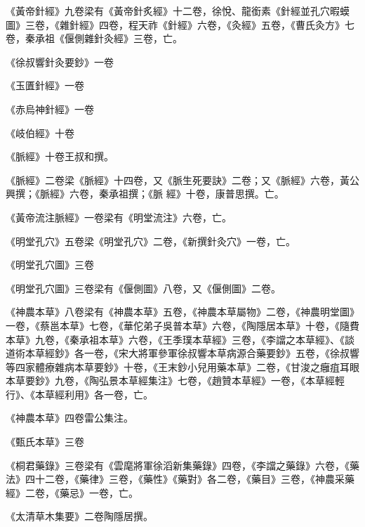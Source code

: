 \begin{pinyinscope}
 《黃帝針經》九卷梁有《黃帝針炙經》十二卷，徐悅、龍銜素《針經並孔穴暇蟆圖》三卷，《雜針經》四卷，程天祚《針經》六卷，《灸經》五卷，《曹氏灸方》七卷，秦承祖《偃側雜針灸經》三卷，亡。



 《徐叔響針灸要鈔》一卷



 《玉匱針經》一卷



 《赤烏神針經》一卷



 《岐伯經》十卷



 《脈經》十卷王叔和撰。



 《脈經》二卷梁《脈經》十四卷，又《脈生死要訣》二卷；又《脈經》六卷，黃公興撰；《脈經》六卷，秦承祖撰；《脈
 經》十卷，康普思撰。亡。



 《黃帝流注脈經》一卷梁有《明堂流注》六卷，亡。



 《明堂孔穴》五卷梁《明堂孔穴》二卷，《新撰針灸穴》一卷，亡。



 《明堂孔穴圖》三卷



 《明堂孔穴圖》三卷梁有《偃側圖》八卷，又《偃側圖》二卷。



 《神農本草》八卷梁有《神農本草》五卷，《神農本草屬物》二卷，《神農明堂圖》一卷，《蔡邕本草》七卷，《華佗弟子吳普本草》六卷，《陶隱居本草》十卷，《隨費本草》九卷，《秦承祖本草》六卷，《王季璞本草經》三卷，《李譡之本草經》、《談道術本草經鈔》各一卷，《宋大將軍參軍徐叔響本草病源合藥要鈔》五卷，《徐叔響等四家體療雜病本草要鈔》十卷，《王末鈔小兒用藥本草》二卷，《甘浚之癰疽耳眼本草要鈔》九卷，《陶弘景本草經集注》七卷，《趙贊本草經》一卷，《本草經輕行》、《本草經利用》各一卷，亡。



 《神農本草》四卷雷公集注。



 《甄氏本草》三卷



 《桐君藥錄》三卷梁有《雲麾將軍徐滔新集藥錄》四卷，《李譡之藥錄》六卷，《藥法》四十二卷，《藥律》三卷，《藥性》《藥對》各二卷，《藥目》三卷，《神農采藥經》二卷，《藥忌》一卷，亡。



 《太清草木集要》二卷陶隱居撰。




\end{pinyinscope}
